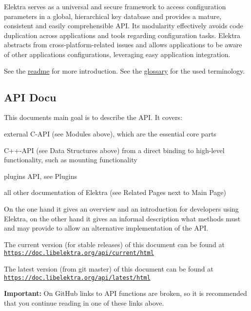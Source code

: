 Elektra serves as a universal and secure framework to access configuration parameters in a global, hierarchical key database and provides a mature, consistent and easily comprehensible A\+PI. Its modularity effectively avoids code duplication across applications and tools regarding configuration tasks. Elektra abstracts from cross-\/platform-\/related issues and allows applications to be aware of other applications\textquotesingle{} configurations, leveraging easy application integration.

See the \hyperlink{README_md}{readme} for more introduction. See the \hyperlink{md_doc_help_elektra-glossary_doc_help_elektra-glossary_md}{glossary} for the used terminology.

\subsection*{A\+PI Docu}

This document\textquotesingle{}s main goal is to describe the A\+PI. It covers\+:


\begin{DoxyItemize}
\item external C-\/\+A\+PI (see Modules above), which are the essential core parts
\item C++-\/\+A\+PI (see Data Structures above) from a direct binding to high-\/level functionality, such as mounting functionality
\item plugins A\+PI, see Plugins
\item all other documentation of Elektra (see Related Pages next to Main Page)
\end{DoxyItemize}

On the one hand it gives an overview and an introduction for developers using Elektra, on the other hand it gives an informal description what methods must and may provide to allow an alternative implementation of the A\+PI.

The current version (for stable releases) of this document can be found at \href{https://doc.libelektra.org/api/current/html}{\tt https\+://doc.\+libelektra.\+org/api/current/html}

The latest version (from git master) of this document can be found at \href{https://doc.libelektra.org/api/latest/html}{\tt https\+://doc.\+libelektra.\+org/api/latest/html}

{\bfseries Important\+:} On Git\+Hub links to A\+PI functions are broken, so it is recommended that you continue reading in one of these links above.

